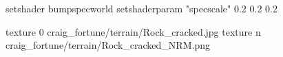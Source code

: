 setshader bumpspecworld
setshaderparam "specscale" 0.2 0.2 0.2

texture 0 craig_fortune/terrain/Rock_cracked.jpg
texture n craig_fortune/terrain/Rock_cracked_NRM.png